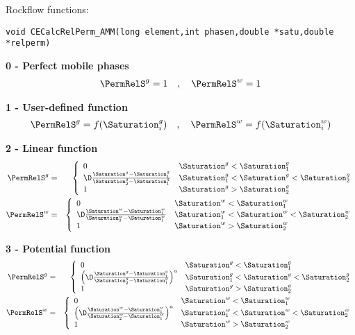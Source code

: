 \vspace{-5mm} Rockflow functions:

\texttt{void CECalcRelPerm\_AMM(long element,int phasen,double
*satu,double *relperm)}


\vspace{5mm}

\textbf{0 - Perfect mobile phases}
\begin{eqnarray}
\PermRelS^g = 1 \quad , \quad \PermRelS^w = 1
\end{eqnarray}

\textbf{1 - User-defined function}
\begin{eqnarray}
\PermRelS^g = f(\Saturation^g_i) \quad , \quad \PermRelS^w =
f(\Saturation^w_i)
\end{eqnarray}

\textbf{2 - Linear function}
\begin{eqnarray}
\PermRelS^g &=& \left\{
\begin{array}{ll}
0 & \Saturation^g < \Saturation^g_1
\\
\D\frac{\Saturation^g-\Saturation^g_1}{\Saturation^g_2-\Saturation^g_1}
& \Saturation^g_1 < \Saturation^g < \Saturation^g_2
\\
1 & \Saturation^g > \Saturation^g_2
\end{array}
\right.
\\
\PermRelS^w &=& \left\{
\begin{array}{ll}
0 & \Saturation^w < \Saturation^w_1
\\
\D\frac{\Saturation^w-\Saturation^w_1}{\Saturation^w_2-\Saturation^w_1}
& \Saturation^w_1 < \Saturation^w < \Saturation^w_2
\\
1 & \Saturation^w > \Saturation^w_2
\end{array}
\right.
\end{eqnarray}


\textbf{3 - Potential function}
\begin{eqnarray}
\PermRelS^g &=& \left\{
\begin{array}{ll}
0 & \Saturation^g < \Saturation^g_1
\\
\left(
\D\frac{\Saturation^g-\Saturation^g_1}{\Saturation^g_2-\Saturation^g_1}
\right)^a & \Saturation^g_1 < \Saturation^g < \Saturation^g_2
\\
1 & \Saturation^g > \Saturation^g_2
\end{array}
\right.
\\
\PermRelS^w &=& \left\{
\begin{array}{ll}
0 & \Saturation^w < \Saturation^w_1
\\
\left(
\D\frac{\Saturation^w-\Saturation^w_1}{\Saturation^w_2-\Saturation^w_1}
\right)^a & \Saturation^w_1 < \Saturation^w < \Saturation^w_2
\\
1 & \Saturation^w > \Saturation^w_2
\end{array}
\right.
\end{eqnarray}


